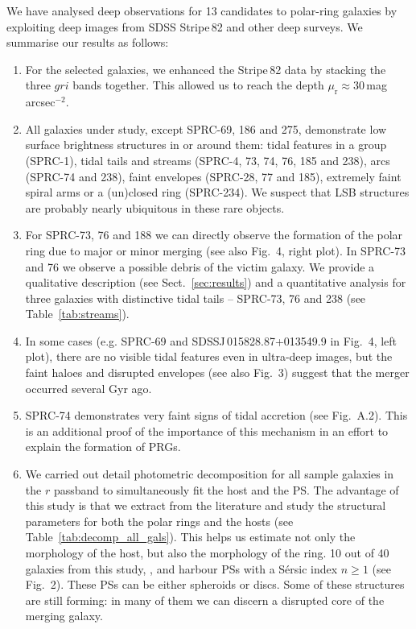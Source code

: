 \documentclass{raa}
\begin{document}
We have analysed deep observations for 13 candidates to polar-ring galaxies by exploiting deep images from SDSS Stripe\,82 and other deep surveys. We summarise our results as follows:
\begin{enumerate}
\item For the selected galaxies, we enhanced the Stripe\,82 data by stacking the three $gri$ bands together. This allowed us to reach the depth $\mu_\mathrm{r}\approx30$\,mag\,arcsec$^{-2}$.
\item All galaxies under study, except SPRC-69, 186 and 275, demonstrate low surface brightness structures in or around them: tidal features in a group (SPRC-1), tidal tails and streams (SPRC-4, 73, 74, 76, 185 and 238), arcs (SPRC-74 and 238), faint envelopes (SPRC-28, 77 and 185), extremely faint spiral arms or a (un)closed ring (SPRC-234). We suspect that LSB structures are probably nearly ubiquitous in these rare objects.
\item For SPRC-73, 76 and 188 we can directly observe the formation of the polar ring due to major or minor merging (see also Fig.~4, right plot). In SPRC-73 and 76 we observe a possible debris of the victim galaxy. We provide a qualitative description (see Sect.~\ref{sec:results}) and a quantitative analysis for three galaxies with distinctive tidal tails -- SPRC-73, 76 and 238 (see Table~\ref{tab:streams}).
\item In some cases (e.g. SPRC-69 and SDSSJ\,015828.87+013549.9 in Fig.~4, left plot), there are no visible tidal features even in ultra-deep images, but the faint haloes and disrupted envelopes (see also Fig.~3) suggest that the merger occurred several Gyr ago.
\item SPRC-74 demonstrates very faint signs of tidal accretion (see Fig.~A.2). This is an additional proof of the importance of this mechanism in an effort to explain the formation of PRGs.
\item We carried out detail photometric decomposition for all sample galaxies in the $r$ passband to simultaneously fit the host and the PS. The advantage of this study is that we extract from the literature and study the structural parameters for both the polar rings and the hosts (see Table~\ref{tab:decomp_all_gals}). This helps us estimate not only the morphology of the host, but also the morphology of the ring. 10 out of 40 galaxies from this study, \citet{rc2015}, and \citet{rm2019} harbour PSs with a S\'ersic index $n\geq1$ (see Fig.~2). These PSs can be either spheroids or discs. Some of these structures are still forming: in many of them we can discern a disrupted core of the merging galaxy.
\end{enumerate}
\end{document}
